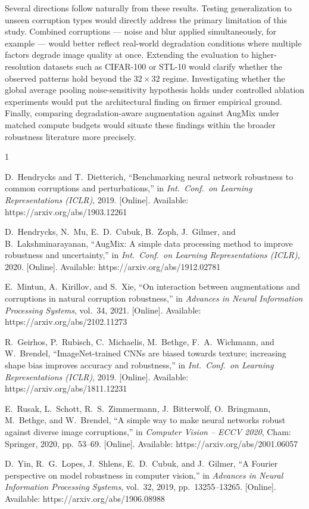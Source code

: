 \documentclass[conference]{IEEEtran}
\begin{document}
Several directions follow naturally from these results. Testing generalization to unseen corruption types would directly address the primary limitation of this study. Combined corruptions --- noise and blur applied simultaneously, for example --- would better reflect real-world degradation conditions where multiple factors degrade image quality at once. Extending the evaluation to higher-resolution datasets such as CIFAR-100 or STL-10 would clarify whether the observed patterns hold beyond the $32{\times}32$ regime. Investigating whether the global average pooling noise-sensitivity hypothesis holds under controlled ablation experiments would put the architectural finding on firmer empirical ground. Finally, comparing degradation-aware augmentation against AugMix under matched compute budgets would situate these findings within the broader robustness literature more precisely.

\begin{thebibliography}{1}

D.~Hendrycks and T.~Dietterich, ``Benchmarking neural network robustness to common corruptions and perturbations,'' in \textit{Int.\ Conf.\ on Learning Representations (ICLR)}, 2019. [Online]. Available: https://arxiv.org/abs/1903.12261

D.~Hendrycks, N.~Mu, E.~D.~Cubuk, B.~Zoph, J.~Gilmer, and B.~Lakshminarayanan, ``AugMix: A simple data processing method to improve robustness and uncertainty,'' in \textit{Int.\ Conf.\ on Learning Representations (ICLR)}, 2020. [Online]. Available: https://arxiv.org/abs/1912.02781

E.~Mintun, A.~Kirillov, and S.~Xie, ``On interaction between augmentations and corruptions in natural corruption robustness,'' in \textit{Advances in Neural Information Processing Systems}, vol.~34, 2021. [Online]. Available: https://arxiv.org/abs/2102.11273

R.~Geirhos, P.~Rubisch, C.~Michaelis, M.~Bethge, F.~A.~Wichmann, and W.~Brendel, ``ImageNet-trained CNNs are biased towards texture; increasing shape bias improves accuracy and robustness,'' in \textit{Int.\ Conf.\ on Learning Representations (ICLR)}, 2019. [Online]. Available: https://arxiv.org/abs/1811.12231

E.~Rusak, L.~Schott, R.~S.~Zimmermann, J.~Bitterwolf, O.~Bringmann, M.~Bethge, and W.~Brendel, ``A simple way to make neural networks robust against diverse image corruptions,'' in \textit{Computer Vision -- ECCV 2020}, Cham: Springer, 2020, pp.~53--69. [Online]. Available: https://arxiv.org/abs/2001.06057

D.~Yin, R.~G.~Lopes, J.~Shlens, E.~D.~Cubuk, and J.~Gilmer, ``A Fourier perspective on model robustness in computer vision,'' in \textit{Advances in Neural Information Processing Systems}, vol.~32, 2019, pp.~13255--13265. [Online]. Available: https://arxiv.org/abs/1906.08988

\end{thebibliography}
\end{document}
